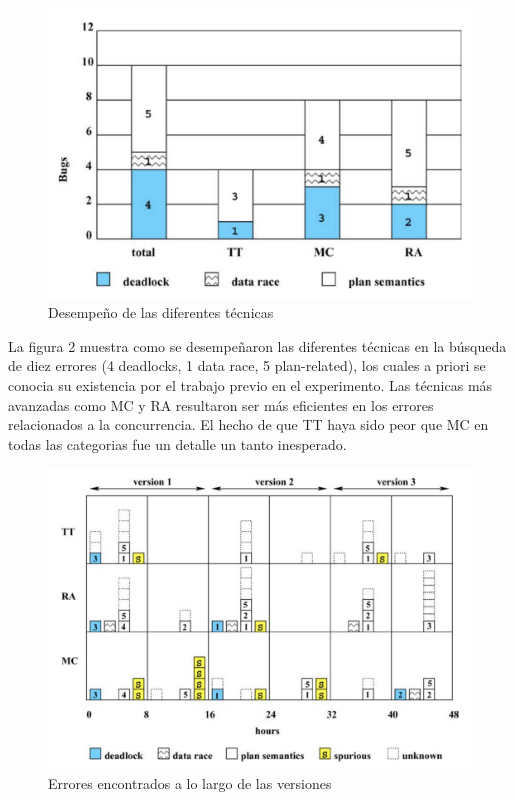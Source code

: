 \documentclass[runningheads]{llncs}
\begin{document}
\begin{figure}[H]
\centering
\includegraphics[scale=0.33]{fig2.png}
\caption{Desempe\~no de las diferentes t\'ecnicas} \label{fig2}
\end{figure}
La figura 2 muestra como se desempe\~naron las diferentes t\'ecnicas en la b\'usqueda de diez errores (4 deadlocks, 1 data race, 5 plan-related), los cuales a priori se conocia su existencia por el trabajo previo en el experimento. Las t\'ecnicas m\'as avanzadas como MC y RA resultaron ser m\'as eficientes en los errores relacionados a la concurrencia. El hecho de que TT haya sido peor que MC en todas las categorias fue un detalle un tanto inesperado.\\

\begin{figure}[H]
\includegraphics[scale=0.5]{fig3.png}
\caption{Errores encontrados a lo largo de las versiones} \label{fig3}
\end{figure}
\end{document}
